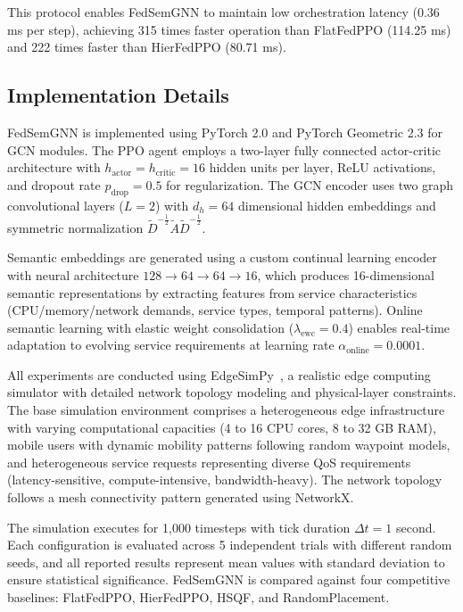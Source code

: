 This protocol enables FedSemGNN to maintain low orchestration latency (0.36 ms per step), achieving 315 times faster operation than FlatFedPPO (114.25 ms) and 222 times faster than HierFedPPO (80.71 ms).

\subsection{Implementation Details}
FedSemGNN is implemented using PyTorch 2.0 and PyTorch Geometric 2.3 for GCN modules. The PPO agent employs a two-layer fully connected actor-critic architecture with $h_{\text{actor}} = h_{\text{critic}} = 16$ hidden units per layer, ReLU activations, and dropout rate $p_{\text{drop}} = 0.5$ for regularization. The GCN encoder uses two graph convolutional layers ($L = 2$) with $d_h = 64$ dimensional hidden embeddings and symmetric normalization $\tilde{D}^{-\frac{1}{2}} \tilde{A} \tilde{D}^{-\frac{1}{2}}$.

Semantic embeddings are generated using a custom continual learning encoder with neural architecture $128 \rightarrow 64 \rightarrow 64 \rightarrow 16$, which produces 16-dimensional semantic representations by extracting features from service characteristics (CPU/memory/network demands, service types, temporal patterns). Online semantic learning with elastic weight consolidation ($\lambda_{\text{ewc}} = 0.4$) enables real-time adaptation to evolving service requirements at learning rate $\alpha_{\text{online}} = 0.0001$.

All experiments are conducted using EdgeSimPy~\cite{edgesimpy}, a realistic edge computing simulator with detailed network topology modeling and physical-layer constraints. The base simulation environment comprises a heterogeneous edge infrastructure with varying computational capacities (4 to 16 CPU cores, 8 to 32 GB RAM), mobile users with dynamic mobility patterns following random waypoint models, and heterogeneous service requests representing diverse QoS requirements (latency-sensitive, compute-intensive, bandwidth-heavy). The network topology follows a mesh connectivity pattern generated using NetworkX.

The simulation executes for 1,000 timesteps with tick duration $\Delta t = 1$ second. Each configuration is evaluated across 5 independent trials with different random seeds, and all reported results represent mean values with standard deviation to ensure statistical significance. FedSemGNN is compared against four competitive baselines: FlatFedPPO, HierFedPPO, HSQF, and RandomPlacement.

